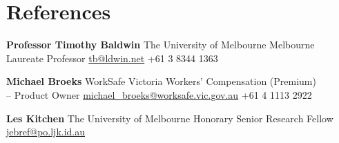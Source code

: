 \documentclass[10pt]{article}
\newcommand{\reference}[5]{
    \textbf{#1} \newline
    {\footnotesize #2} \newline
    #3 \newline
    \href{mailto:#4}{#4} \newline
    #5 \newline
}
\begin{document}
\begin{minipage}[t]{.35\textwidth}
\medskip

\section{References}

\reference{Professor Timothy Baldwin}
{The University of Melbourne}
{Melbourne Laureate Professor}
{tb@ldwin.net}
{+61 3 8344 1363}

\medskip

\reference{Michael Broeks}
{WorkSafe Victoria}
{Workers' Compensation (Premium) \\ -- Product Owner}
{michael\_broeks@worksafe.vic.gov.au}
{+61 4 1113 2922}

\medskip

\reference{Les Kitchen}
{The University of Melbourne}
{Honorary Senior Research Fellow}
{jebref@po.ljk.id.au}
{\null}


\end{minipage}\hfill
\end{document}
